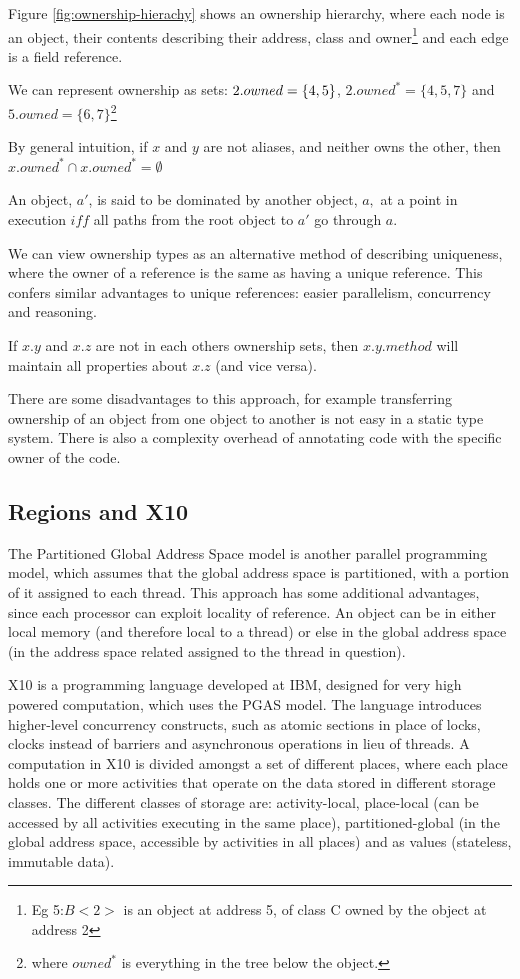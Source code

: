 \documentclass[pdftex,11pt,a4paper]{report}
\begin{document}
Figure \ref{fig:ownership-hierachy} shows an ownership hierarchy, where each node is an object, their contents describing their address, class and owner\footnote{Eg 5:$B<2>$ is an object at address 5, of class C owned by the object at address 2} and each edge is a field reference.

We can represent ownership as sets:
$\/2.owned=\{4,5\}$, $2.owned^{*}=\{4,5,7\}$ and $5.owned=\{6,7\}$\footnote{where $owned^{*}$ is everything in the tree below the object.}

By general intuition, if $x$ and $y$ are not aliases, and neither owns the other, then $x.owned^{*} \cap x.owned^{*} = \emptyset$

An object, $a'$, is said to be dominated by another object, $a,$ at a point in execution $iff$ all paths from the root object to $a'$ go through $a$.

We can view ownership types as an alternative method of describing uniqueness, where the owner of a reference is the same as having a unique reference.
This confers similar advantages to unique references: easier parallelism, concurrency and reasoning.

If $x.y$ and $x.z$ are not in each others ownership sets, then $x.y.method$ will maintain
all properties about $x.z$ (and vice versa).

There are some disadvantages to this approach, for example transferring ownership of an object from one object to another is not easy in a static type system\cite{clarke1998}.
There is also a complexity overhead of annotating code with the specific owner of the code.

\subsection{Regions and X10}
\label{sec:regions}

The Partitioned Global Address Space model\cite{pgas} is another parallel programming model, which assumes that the global address space is partitioned, with a portion of it assigned to each thread.
This approach has some additional advantages, since each processor can exploit locality of reference.
An object can be in either local memory (and therefore local to a thread) or else in the global address space (in the address space related assigned to the thread in question).

X10 is a programming language developed at IBM, designed for very high powered computation, which uses the PGAS model.
The language introduces higher-level concurrency constructs, such as atomic sections in place of locks, clocks instead of barriers and asynchronous operations in lieu of threads\cite{x10}.
A computation in X10 is divided amongst a set of different places, where each place holds one or more activities that operate on the data stored in different storage classes.
The different classes of storage are: activity-local, place-local (can be accessed by all activities executing in the same place), partitioned-global (in the global address space, accessible by activities in all places) and as values (stateless, immutable data)\cite{x10-places}.
\end{document}
